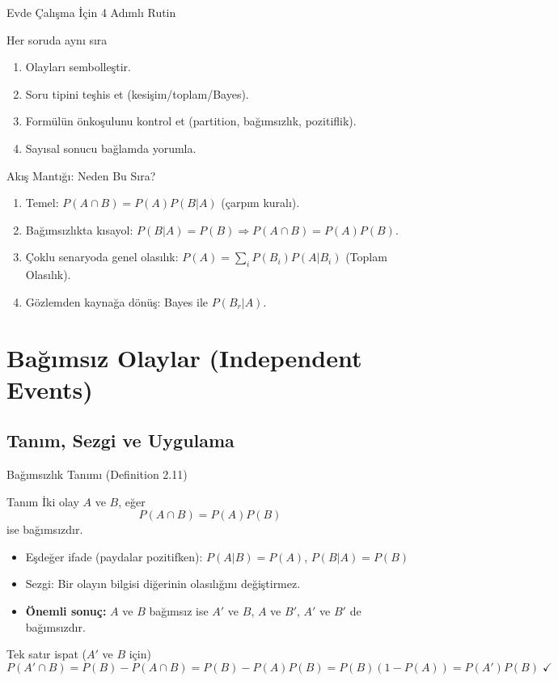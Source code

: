 \documentclass[light]{lutbeamer}
\begin{document}
\begin{frame}{Evde Çalışma İçin 4 Adımlı Rutin}
    \begin{block}{Her soruda aynı sıra}
        \begin{enumerate}
            \item Olayları sembolleştir.
            \item Soru tipini teşhis et (kesişim/toplam/Bayes).
            \item Formülün önkoşulunu kontrol et (partition, bağımsızlık, pozitiflik).
            \item Sayısal sonucu bağlamda yorumla.
        \end{enumerate}
    \end{block}
\end{frame}

\begin{frame}{Akış Mantığı: Neden Bu Sıra?}
    \begin{enumerate}
        \item Temel: \(P(A\cap B)=P(A)P(B|A)\) (çarpım kuralı).
        \item Bağımsızlıkta kısayol: \(P(B|A)=P(B)\Rightarrow P(A\cap B)=P(A)P(B)\).
        \item Çoklu senaryoda genel olasılık: \(P(A)=\sum_i P(B_i)P(A|B_i)\) (Toplam Olasılık).
        \item Gözlemden kaynağa dönüş: Bayes ile \(P(B_r|A)\).
    \end{enumerate}
\end{frame}

\section{Bağımsız Olaylar (Independent Events)}
\subsection{Tanım, Sezgi ve Uygulama}

\begin{frame}{Bağımsızlık Tanımı (Definition 2.11)}
    \begin{block}{Tanım}
        İki olay \(A\) ve \(B\), eğer
        \[
        P(A\cap B)=P(A)P(B)
        \]
        ise bağımsızdır.
    \end{block}

    \begin{itemize}
        \item Eşdeğer ifade (paydalar pozitifken): \(P(A|B)=P(A)\), \(P(B|A)=P(B)\)
        \item Sezgi: Bir olayın bilgisi diğerinin olasılığını değiştirmez.
        \item \textbf{Önemli sonuç:} $A$ ve $B$ bağımsız ise $A'$ ve $B$,\; $A$ ve $B'$,\; $A'$ ve $B'$ de bağımsızdır.
    \end{itemize}

    \begin{block}{Tek satır ispat ($A'$ ve $B$ için)}
        \[
        P(A'\cap B)=P(B)-P(A\cap B)=P(B)-P(A)P(B)=P(B)(1-P(A))=P(A')P(B) \;\checkmark
        \]
    \end{block}
\end{frame}
\end{document}
